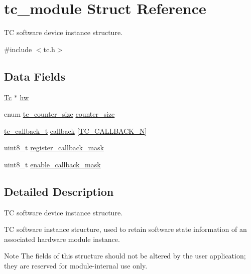 \hypertarget{structtc__module}{}\section{tc\+\_\+module Struct Reference}
\label{structtc__module}


TC software device instance structure.  




{\ttfamily \#include $<$tc.\+h$>$}

\subsection*{Data Fields}
\begin{DoxyCompactItemize}
\item 
\mbox{\hyperlink{union_tc}{Tc}} $\ast$ \mbox{\hyperlink{structtc__module_a4e05e4e73ff3a72e16b23bb2e44af519}{hw}}
\item 
enum \mbox{\hyperlink{group__asfdoc__sam0__tc__group_ga1b112627b81227c49c16b1a93e3321a0}{tc\+\_\+counter\+\_\+size}} \mbox{\hyperlink{structtc__module_aab0e5adb1f12875949e072f548ce2895}{counter\+\_\+size}}
\item 
\mbox{\hyperlink{group__asfdoc__sam0__tc__group_ga2a1d57f42085001f29a6584ae8ab1bb4}{tc\+\_\+callback\+\_\+t}} \mbox{\hyperlink{structtc__module_ad76de8a864ec5d6ba1eb04dd8b758adf}{callback}} \mbox{[}\mbox{\hyperlink{group__asfdoc__sam0__tc__group_gga7d3fb5365e46bd4efae2885bd508067faf76c479c366d3c15450245bb4ee9a856}{T\+C\+\_\+\+C\+A\+L\+L\+B\+A\+C\+K\+\_\+N}}\mbox{]}
\item 
uint8\+\_\+t \mbox{\hyperlink{structtc__module_a76596f8e0d1d5567da4bb6099bc15708}{register\+\_\+callback\+\_\+mask}}
\item 
uint8\+\_\+t \mbox{\hyperlink{structtc__module_a79ea1f5a1699e0e2c93bd3d993257e45}{enable\+\_\+callback\+\_\+mask}}
\end{DoxyCompactItemize}


\subsection{Detailed Description}
TC software device instance structure. 

TC software instance structure, used to retain software state information of an associated hardware module instance.

\begin{DoxyNote}{Note}
The fields of this structure should not be altered by the user application; they are reserved for module-\/internal use only. 
\end{DoxyNote}


